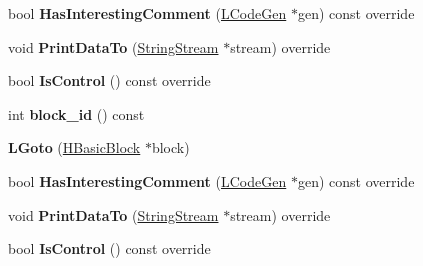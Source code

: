 \begin{DoxyCompactItemize}
\item 
bool {\bfseries Has\+Interesting\+Comment} (\hyperlink{classv8_1_1internal_1_1_l_code_gen}{L\+Code\+Gen} $\ast$gen) const  override\hypertarget{classv8_1_1internal_1_1_l_goto_ae2dcadae50f2f182e7f9d772a170fe7b}{}\label{classv8_1_1internal_1_1_l_goto_ae2dcadae50f2f182e7f9d772a170fe7b}

\item 
void {\bfseries Print\+Data\+To} (\hyperlink{classv8_1_1internal_1_1_string_stream}{String\+Stream} $\ast$stream) override\hypertarget{classv8_1_1internal_1_1_l_goto_a42fa9224cfb4df48322ebdcf082ab6db}{}\label{classv8_1_1internal_1_1_l_goto_a42fa9224cfb4df48322ebdcf082ab6db}

\item 
bool {\bfseries Is\+Control} () const  override\hypertarget{classv8_1_1internal_1_1_l_goto_a4d45f583f9f81949e0ec9ab82d0a4dd1}{}\label{classv8_1_1internal_1_1_l_goto_a4d45f583f9f81949e0ec9ab82d0a4dd1}

\item 
int {\bfseries block\+\_\+id} () const \hypertarget{classv8_1_1internal_1_1_l_goto_a232c7b24fbe5cb48aa50908fe3d26626}{}\label{classv8_1_1internal_1_1_l_goto_a232c7b24fbe5cb48aa50908fe3d26626}

\item 
{\bfseries L\+Goto} (\hyperlink{classv8_1_1internal_1_1_h_basic_block}{H\+Basic\+Block} $\ast$block)\hypertarget{classv8_1_1internal_1_1_l_goto_a508956b700f4a115d2ae81e5c81b6d52}{}\label{classv8_1_1internal_1_1_l_goto_a508956b700f4a115d2ae81e5c81b6d52}

\item 
bool {\bfseries Has\+Interesting\+Comment} (\hyperlink{classv8_1_1internal_1_1_l_code_gen}{L\+Code\+Gen} $\ast$gen) const  override\hypertarget{classv8_1_1internal_1_1_l_goto_ae2dcadae50f2f182e7f9d772a170fe7b}{}\label{classv8_1_1internal_1_1_l_goto_ae2dcadae50f2f182e7f9d772a170fe7b}

\item 
void {\bfseries Print\+Data\+To} (\hyperlink{classv8_1_1internal_1_1_string_stream}{String\+Stream} $\ast$stream) override\hypertarget{classv8_1_1internal_1_1_l_goto_a42fa9224cfb4df48322ebdcf082ab6db}{}\label{classv8_1_1internal_1_1_l_goto_a42fa9224cfb4df48322ebdcf082ab6db}

\item 
bool {\bfseries Is\+Control} () const  override\hypertarget{classv8_1_1internal_1_1_l_goto_a4d45f583f9f81949e0ec9ab82d0a4dd1}{}\label{classv8_1_1internal_1_1_l_goto_a4d45f583f9f81949e0ec9ab82d0a4dd1}


\end{DoxyCompactItemize}
